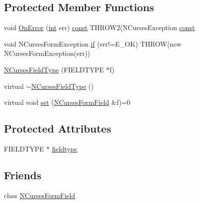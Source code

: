 \subsection*{Protected Member Functions}
\begin{DoxyCompactItemize}
\item 
void \hyperlink{class_n_curses_field_type_a0ad3eb32ee38316369e5019c7b7bfdcf}{On\-Error} (\hyperlink{term__entry_8h_ad65b480f8c8270356b45a9890f6499ae}{int} err) \hyperlink{term__entry_8h_a57bd63ce7f9a353488880e3de6692d5a}{const} T\-H\-R\-O\-W2(N\-Curses\-Exception \hyperlink{term__entry_8h_a57bd63ce7f9a353488880e3de6692d5a}{const} 
\item 
void N\-Curses\-Form\-Exception \hyperlink{class_n_curses_field_type_a38565d555546ece340f89c57033d8b32}{if} (err!=E\-\_\-\-O\-K) T\-H\-R\-O\-W(new N\-Curses\-Form\-Exception(err))
\item 
\hyperlink{class_n_curses_field_type_abcd01b5e4a301b73eb4e404877c1d5a9}{N\-Curses\-Field\-Type} (F\-I\-E\-L\-D\-T\-Y\-P\-E $\ast$f)
\item 
virtual \hyperlink{class_n_curses_field_type_a3de5c7b452e2d4872c626d607c8e177e}{$\sim$\-N\-Curses\-Field\-Type} ()
\item 
virtual void \hyperlink{class_n_curses_field_type_ab799f23fdd17b204950e36962b38da43}{set} (\hyperlink{class_n_curses_form_field}{N\-Curses\-Form\-Field} \&f)=0
\end{DoxyCompactItemize}
\subsection*{Protected Attributes}
\begin{DoxyCompactItemize}
\item 
F\-I\-E\-L\-D\-T\-Y\-P\-E $\ast$ \hyperlink{class_n_curses_field_type_a78b6e494cf9d2ca180dc4e6e92402863}{fieldtype}
\end{DoxyCompactItemize}
\subsection*{Friends}
\begin{DoxyCompactItemize}
\item 
class \hyperlink{class_n_curses_field_type_a35bbdfb43bd305d5686fec6f4a4010d5}{N\-Curses\-Form\-Field}
\end{DoxyCompactItemize}


